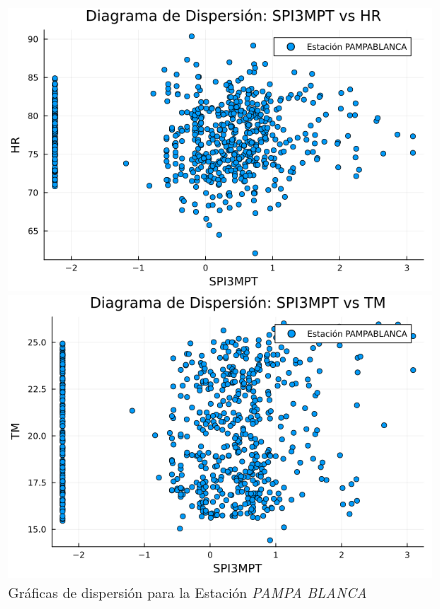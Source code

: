 \begin{figure}[htbp]
\centering
\caption{Gráficas de dispersión para la Estación \textit{PAMPA BLANCA}}
\begin{minipage}{0.32\textwidth}
    \centering
    \includegraphics[width=\linewidth]{Capitulos/Scaterplot/PAMPABLANCA_SPI3MPT_vs_HR.png}
\end{minipage}\hfill
\begin{minipage}{0.32\textwidth}
    \centering
    \includegraphics[width=\linewidth]{Capitulos/Scaterplot/PAMPABLANCA_SPI3MPT_vs_TM.png}
\end{minipage}\hfill
\begin{minipage}{0.32\textwidth}
    \centering

\end{minipage}
\end{figure}
